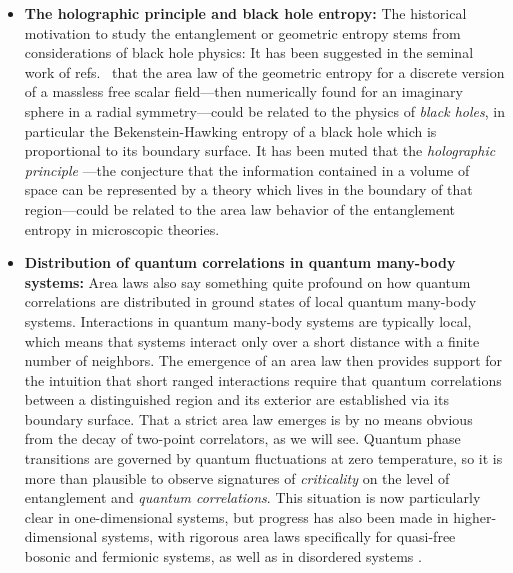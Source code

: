 \documentclass[rmp,twocolumn,floatfix,epsfig,graphics]{revtex4} %
\begin{document}
\begin{itemize}

\item {\bf The holographic principle and black hole entropy:} 
The historical motivation to study the entanglement or geometric 
entropy stems from considerations of black hole physics: It 
has been suggested in the seminal work of refs.\ 
\cite{Bombelli,Srednicki} that the area law of the geometric 
entropy for a discrete version of a massless free scalar 
field---then numerically found for an imaginary sphere in 
a radial symmetry---could be related to the physics of 
{\it black holes},\cite{HardStuff} in particular the 
Bekenstein-Hawking entropy of a black hole which is proportional
to its boundary surface. It has been muted that 
the {\it holographic principle} \cite{Holographic}---the 
conjecture that the information contained in a volume of 
space can be represented by a theory which lives in the 
boundary of that region---could be related to the area 
law behavior of the entanglement entropy in microscopic
theories.

\item {\bf Distribution of quantum correlations in quantum 
many-body systems:} Area laws also say something quite profound 
on how quantum correlations are distributed in ground states of 
local quantum many-body systems. Interactions in quantum many-body 
systems are typically local, which means that systems interact 
only over a short distance with a finite number of neighbors. 
The emergence of an area law then provides support for the
intuition that short ranged interactions require that quantum 
correlations between a distinguished region and its exterior 
are established via its boundary surface. That a strict area 
law emerges is by no means obvious from the decay of two-point 
correlators, as we will see. Quantum phase transitions are 
governed by quantum fluctuations at zero temperature, so it 
is more than plausible to observe signatures of {\it criticality} 
on the level of entanglement and {\it quantum correlations}. This 
situation is now particularly clear in one-dimensional systems, 
\cite{Harmonic,Latorre1,Fannes,Korepin,FranciniLong,Calabrese,Latorre2,Single,Its,Keating,Farkas,OldBriegel,Quench,Vidal,JVidalLong,Vidal2,Casini,Cardy2,OneD,Cardy3,Review}
but progress has also been made in higher-dimensional systems,\cite{Area,Area2,Area3,Graphs,Quench2,LatorreReview,PEPS,Wolf,FarkasLong,Preskill,Fradkin}
with rigorous area laws specifically for quasi-free bosonic \cite{Area,Area2,Area3} and 
fermionic \cite{Wolf,Klich,Halfspace,FarkasLong} systems,
as well as in
disordered systems \cite{Refael2}.


\end{itemize}
\end{document}
